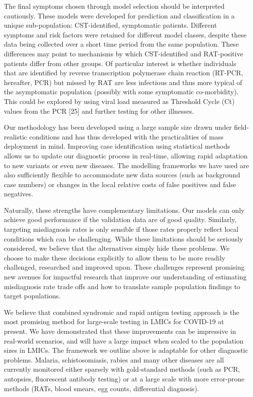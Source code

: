 \documentclass[]{elsarticle} %
\begin{document}
The final symptoms chosen through model selection should be interpreted cautiously.
These models were developed for prediction and classification in a unique sub-population: CST-identified, symptomatic patients.
Different symptoms and risk factors were retained for different model classes, despite these data being collected over a short time period from the same population.
These differences may point to mechanisms by which CST-identified and RAT-positive patients differ from other groups.
Of particular interest is whether individuals that are identified by reverse transcription polymerase chain reaction (RT-PCR, hereafter, PCR) but missed by RAT are less infectious and thus more typical of the asymptomatic population (possibly with some symptomatic co-morbidity).
This could be explored by using viral load measured as Threshold Cycle (Ct) values from the PCR {[}25{]} and further testing for other illnesses.

Our methodology has been developed using a large sample size drawn under field-realistic conditions and has thus developed with the practicalities of mass deployment in mind.
Improving case identification using statistical methods allows us to update our diagnostic process in real-time, allowing rapid adaptation to new variants or even new diseases.
The modelling frameworks we have used are also sufficiently flexible to accommodate new data sources (such as background case numbers) or changes in the local relative costs of false positives and false negatives.

Naturally, these strengths have complementary limitations.
Our models can only achieve good performance if the validation data are of good quality.
Similarly, targeting misdiagnosis rates is only sensible if those rates properly reflect local conditions which can be challenging.
While these limitations should be seriously considered, we believe that the alternatives simply hide these problems.
We choose to make these decisions explicitly to allow them to be more readily challenged, researched and improved upon.
These challenges represent promising new avenues for impactful research that improve our understanding of estimating misdiagnosis rate trade offs and how to translate sample population findings to target populations.

We believe that combined syndromic and rapid antigen testing approach is the most promising method for large-scale testing in LMICs for COVID-19 at present.
We have demonstrated that these improvements can be impressive in real-world scenarios, and will have a large impact when scaled to the population sizes in LMICs.
The framework we outline above is adaptable for other diagnostic problems.
Malaria, schistosomiasis, rabies and many other diseases are all currently monitored either sparsely with gold-standard methods (such as PCR, autopsies, fluorescent antibody testing) or at a large scale with more error-prone methods (RATs, blood smears, egg counts, differential diagnosis).
\end{document}
